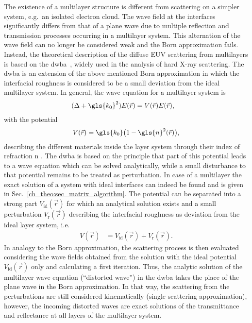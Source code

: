 The existence of a multilayer structure is different from scattering on a simpler system, e.g.~an isolated electron cloud. The wave field at the interfaces significantly differs from that of a plane wave due to multiple reflection and transmission processes occurring in a multilayer system. This alternation of the wave field can no longer be considered weak and the Born approximation fails. Instead, the theoretical description of the diffuse EUV scattering from multilayers is based on the \gls{dwba}~\cite{holy_nonspecular_1994,holy_x-ray_1993}, widely used in the analysis of hard X-ray scattering. The \gls{dwba} is an extension of the above mentioned Born approximation in which the interfacial roughness is considered to be a small deviation from the ideal multilayer system. In general, the wave equation for a multilayer system is
\begin{align}
        (\Delta + \gls{k_0}^2) E(\vec{r}) &= V(\vec{r}) E(\vec{r})\text{,} \label{ch_theo:eqn_multilayer_wave_equation} 
\end{align}
with the potential
\begin{align}
V(\vec{r}) = \gls{k_0}\big(1-\gls{n}^2(\vec{r})\big) \text{,} \label{ch_theo:eqn_potential_inside_layer}
\end{align}
describing the different materials inside the layer system through their index of refraction \gls{n} \cite{pietsch_high-resolution_2004}. The \gls{dwba} is based on the principle that part of this potential leads to a wave equation which can be solved analytically, while a small disturbance to that potential remains to be treated as perturbation. In case of a multilayer the exact solution of a system with ideal interfaces can indeed be found and is given in Sec.~\ref{ch_theo:sec_matrix_algorithm}. The potential can be separated into a strong part $V_\text{id}(\vec{r})$ for which an analytical solution exists and a small perturbation $V_\text{r}(\vec{r})$ describing the interfacial roughness as deviation from the ideal layer system, i.e.
\begin{align}
V(\vec{r}) &= V_\text{id}(\vec{r}) + V_\text{r}(\vec{r})\text{.} \label{ch_theo:eqn_ideal_and_pertubation_potential}
\end{align}
In analogy to the Born approximation, the scattering process is then evaluated considering the wave fields obtained from the solution with the ideal potential $V_\text{id}(\vec{r})$ only and calculating a first iteration. Thus, the analytic solution of the multilayer wave equation (``distorted wave'') in the \gls{dwba} takes the place of the plane wave in the Born approximation. In that way, the scattering from the perturbations are still considered kinematically (single scattering approximation), however, the incoming distorted waves are exact solutions of the transmittance and reflectance at all layers of the multilayer system.

